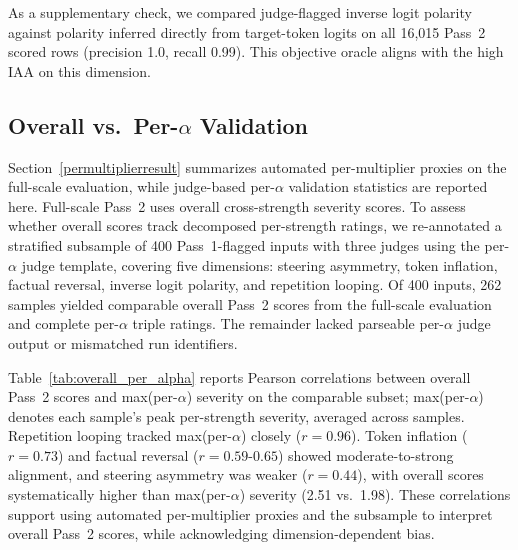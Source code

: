 As a supplementary check, we compared judge-flagged inverse logit polarity against polarity inferred directly from target-token logits on all 16{,}015 Pass~2 scored rows (precision 1.0, recall 0.99).
This objective oracle aligns with the high IAA on this dimension.

\subsection{Overall vs.\ Per-\texorpdfstring{$\alpha$}{alpha} Validation}\label{per alpha result}
Section~\ref{permultiplierresult} summarizes automated per-multiplier proxies on the full-scale evaluation, while judge-based per-$\alpha$ validation statistics are reported here.
Full-scale Pass~2 uses overall cross-strength severity scores.
To assess whether overall scores track decomposed per-strength ratings, we re-annotated a stratified subsample of 400 Pass~1-flagged inputs with three judges using the per-$\alpha$ judge template, covering five dimensions: steering asymmetry, token inflation, factual reversal, inverse logit polarity, and repetition looping.
Of 400 inputs, 262 samples yielded comparable overall Pass~2 scores from the full-scale evaluation and complete per-$\alpha$ triple ratings.
The remainder lacked parseable per-$\alpha$ judge output or mismatched run identifiers.

Table~\ref{tab:overall_per_alpha} reports Pearson correlations between overall Pass~2 scores and max(per-$\alpha$) severity on the comparable subset; max(per-$\alpha$) denotes each sample's peak per-strength severity, averaged across samples.
Repetition looping tracked max(per-$\alpha$) closely ($r{=}0.96$).
Token inflation ($r{=}0.73$) and factual reversal ($r{=}0.59$-$0.65$) showed moderate-to-strong alignment, and steering asymmetry was weaker ($r{=}0.44$), with overall scores systematically higher than max(per-$\alpha$) severity (2.51 vs.\ 1.98).
These correlations support using automated per-multiplier proxies and the subsample to interpret overall Pass~2 scores, while acknowledging dimension-dependent bias.

\begin{table}[htbp]
  \centering\small
  \caption{Overall vs.\ max(per-$\alpha$) severity correlations ($n{=}262$ comparable samples, three raters).}
  \label{tab:overall_per_alpha}
\end{table}

